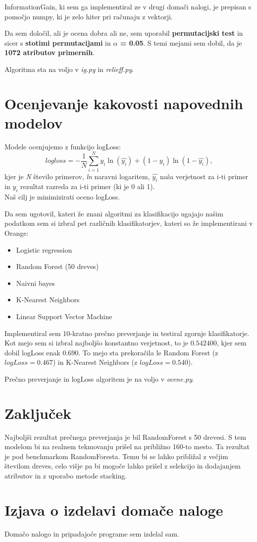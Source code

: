 \documentclass[a4paper,11pt]{article}
\begin{document}
InformationGain, ki sem ga implementiral ze v drugi domači nalogi, je prepisan s pomočjo numpy, ki je zelo hiter pri računaju z vektorji.

Da sem določil, ali je ocena dobra ali ne, sem uporabil \textbf{permutacijski test} in sicer s \textbf{stotimi permutacijami} in \textbf{$\alpha$ = 0.05}. S temi mejami sem dobil, da je \textbf{1072 atributov primernih}.

Algoritma sta na voljo v \textit{ig.py} in \textit{relieff.py}. 

\section{Ocenjevanje kakovosti napovednih modelov}
Modele ocenjujemo z funkcijo logLoss:
$$log loss=-\frac{1}{N}\sum_{i=1}^Ny_i\ln\left(\hat{y_i}\right)+\left(1-y_i\right)\ln\left(1-\hat{y_i}\right),$$ kjer je \textit{N} število primerov, \textit{ln} naravni logaritem, $\hat{y_i}$ naša verjetnost za i-ti primer in $y_i$ rezultat razreda za i-ti primer (ki je 0 ali 1).
$$$$
Naš cilj je minimizirati oceno logLoss.

Da sem ugotovil, kateri že znani algoritmi za klasifikacijo ugajajo našim podatkom sem si izbral pet različnih klasifikatorjev, kateri so že implementirani v Orange:
\begin{itemize}
\item Logistic regression
\item Random Forest (50 dreves)
\item Naivni bayes
\item K-Nearest Neighbors
\item Linear Support Vector Machine
\end{itemize}

Implementiral sem 10-kratno prečno preverjanje in testiral zgornje klasifikatorje. Kot mejo sem si izbral najboljšo konstantno verjetnost, to je $0.542400$, kjer sem dobil logLoss enak $0.690$. To mejo sta prekoračila le Random Forest (z $logLoss = 0.467$) in K-Nearest Neighbors (z $logLoss = 0.540$).

Prečno preverjanje in logLoss algoritem je na voljo v \textit{ocene.py}.

\section{Zaključek}
Najboljši rezultat prečnega preverjanja je bil RandomForest s 50 drevesi. S tem modelom bi na realnem tekmovanju prišel na približno 160-to mesto. Ta rezultat je pod benchmarkom RandomForesta. Temu bi se lahko približal z večjim številom dreves, celo višje pa bi mogoče lahko prišel z selekcijo in dodajanjem atributov in z uporabo metode stacking.

\section{Izjava o izdelavi domače naloge}
Domačo nalogo in pripadajoče programe sem izdelal sam.
\end{document}
